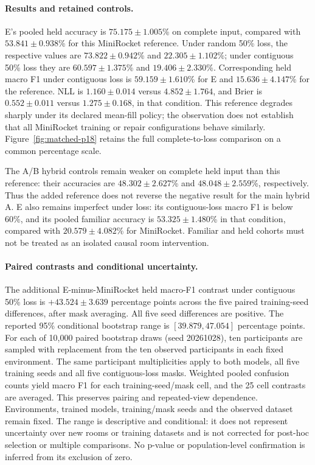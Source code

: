 \paragraph{Results and retained controls.}
E's pooled held accuracy is $75.175\pm1.005$\% on complete input, compared
with $53.841\pm0.938$\% for this MiniRocket reference. Under random 50\% loss,
the respective values are $73.822\pm0.942$\% and $22.305\pm1.102$\%;
under contiguous 50\% loss they are $60.597\pm1.375$\% and
$19.406\pm2.330$\%. Corresponding held macro F1 under contiguous loss is
$59.159\pm1.610$\% for E and $15.636\pm4.147$\% for the reference.
NLL is $1.160\pm0.014$ versus $4.852\pm1.764$, and Brier is
$0.552\pm0.011$ versus $1.275\pm0.168$, in that condition. This reference
degrades sharply under its declared mean-fill policy; the observation does
not establish that all MiniRocket training or repair configurations behave
similarly. Figure~\ref{fig:matched-p18} retains the full complete-to-loss
comparison on a common percentage scale.

The A/B hybrid controls remain weaker on complete held input than this
reference: their accuracies are $48.302\pm2.627$\% and
$48.048\pm2.559$\%, respectively. Thus the added reference does not reverse
the negative result for the main hybrid A. E also remains imperfect under
loss: its contiguous-loss macro F1 is below 60\%, and its pooled familiar
accuracy is $53.325\pm1.480$\% in that condition, compared with
$20.579\pm4.082$\% for MiniRocket. Familiar and held cohorts must not be
treated as an isolated causal room intervention.

\paragraph{Paired contrasts and conditional uncertainty.}
The additional E-minus-MiniRocket held macro-F1 contrast under contiguous
50\% loss is $+43.524\pm3.639$ percentage points across the five paired
training-seed differences, after mask averaging. All five seed differences
are positive. The reported 95\% conditional bootstrap range is
$[39.879,47.054]$ percentage points. For each of 10,000 paired bootstrap
draws (seed 20261028), ten participants are sampled with replacement from
the ten observed participants in each fixed environment. The same participant
multiplicities apply to both models, all five training seeds and all five
contiguous-loss masks. Weighted pooled confusion counts yield macro F1 for
each training-seed/mask cell, and the 25 cell contrasts are averaged.
This preserves pairing and repeated-view dependence. Environments, trained
models, training/mask seeds and the observed dataset remain fixed.
The range is descriptive and conditional: it does not represent uncertainty
over new rooms or training datasets and is not corrected for post-hoc
selection or multiple comparisons. No p-value or population-level
confirmation is inferred from its exclusion of zero.


